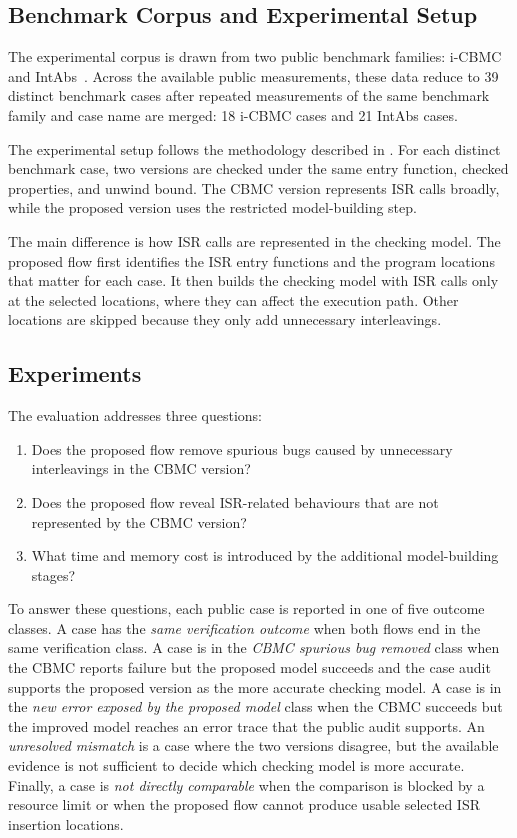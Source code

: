 \subsection{Benchmark Corpus and Experimental Setup}

The experimental corpus is drawn from two public benchmark families:
i-CBMC~\cite{icbmc_site} and IntAbs~\cite{intabs_repo}.
Across the available public measurements, these data reduce to 39 distinct
benchmark cases after repeated measurements of the same benchmark family and
case name are merged: 18 i-CBMC cases and 21 IntAbs cases.

The experimental setup follows the methodology described in .
For each distinct benchmark case, two versions are checked under the same
entry function, checked properties, and unwind bound. The CBMC version
represents ISR calls broadly, while the proposed version uses the
restricted model-building step.

The main difference is how ISR calls are represented in the checking model.
The proposed flow first identifies the ISR entry functions and the program
locations that matter for each case. It then builds the checking model with
ISR calls only at the selected locations, where they can affect the execution
path. Other locations are skipped because they only add unnecessary
interleavings.

\subsection{Experiments}

The evaluation addresses three questions:

\begin{enumerate}[leftmargin=1.5em]
\item Does the proposed flow remove spurious bugs caused by unnecessary interleavings in the CBMC version?
\item Does the proposed flow reveal ISR-related behaviours that are not represented by the CBMC version?
\item What time and memory cost is introduced by the additional model-building stages?
\end{enumerate}

To answer these questions, each public case is reported in one of five outcome classes. 
A case has the \emph{same verification outcome} when both flows end in the same verification class. 
A case is in the \emph{CBMC spurious bug removed} class when the CBMC reports failure but the proposed model succeeds and the case audit supports the proposed version as the more accurate checking model. 
A case is in the \emph{new error exposed by the proposed model} class when the CBMC succeeds but the improved model reaches an error trace that the public audit supports. 
An \emph{unresolved mismatch} is a case where the two versions disagree, but the available evidence is not sufficient to decide which checking model is more accurate.
Finally, a case is \emph{not directly comparable} when the comparison is blocked by a resource limit or when the proposed flow cannot produce usable selected ISR insertion locations.

